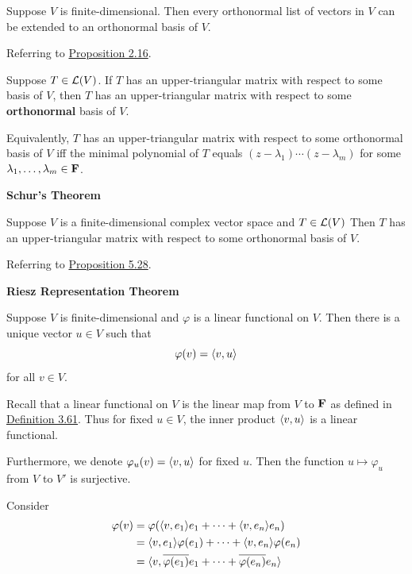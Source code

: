 \documentclass[12pt,a4paper]{article}
\begin{document}
    \begin{prop}\label{6.22}
        Suppose $V$ is finite-dimensional. Then every orthonormal list of vectors in $V$ can be extended to an orthonormal basis of $V$.
    \end{prop}
    \begin{remark}
        Referring to \hyperref[2.16]{Proposition 2.16}.
    \end{remark}
    \hfill

    \begin{prop}\label{6.23}
        Suppose $T\in\mathcal{L}(V)$. If $T$ has an upper-triangular matrix with respect to some basis of $V$, then $T$ has an upper-triangular matrix with respect to some \textbf{orthonormal} basis of $V$.

        Equivalently, $T$ has an upper-triangular matrix with respect to some orthonormal basis of $V$ iff the minimal polynomial of $T$ equals $(z-\lambda_1)\cdots(z-\lambda_m)$ for some $\lambda_1,\dots,\lambda_m\in\mathbf{F}$.
        
    \end{prop}
    \begin{cor}\label{6.24}
        \textbf{Schur’s Theorem}

        Suppose $V$ is a finite-dimensional complex vector space and $T\in\mathcal{L}(V)$ Then $T$ has an upper-triangular matrix with respect to some orthonormal basis of $V$.
    \end{cor}
    \begin{remark}
        Referring to \hyperref[5.28]{Proposition 5.28}.
    \end{remark}
    \hfill

    \begin{thm}\label{6.25}
        \textbf{Riesz Representation Theorem}

        Suppose $V$ is finite-dimensional and $\varphi$ is a linear functional on $V$. Then there is a unique vector $u\in V$ such that 
        $$
        \varphi(v)=\langle v,u\rangle
        $$
        for all $v\in V$.
    \end{thm}
    \begin{remark}
        Recall that a linear functional on $V$ is the linear map from $V$ to $\mathbf{F}$ as defined in \hyperref[3.61]{Definition 3.61}. Thus for fixed $u\in V$, the inner product $\langle v,u\rangle$ is a linear functional.

        Furthermore, we denote $\varphi_{u}(v)=\langle v,u\rangle$ for fixed $u$. Then the function $u\mapsto \varphi_{u}$ from $V$ to $V'$ is surjective.
    \end{remark}   
    \begin{remark}
        Consider
        $$
        \begin{aligned}
            \varphi(v)
            &=\varphi(\langle v,e_1\rangle e_1+\cdots+\langle v,e_n\rangle e_n)\\
            &=\langle v,e_1\rangle\varphi(e_1)+\cdots+\langle v,e_n\rangle\varphi(e_n)\\
            &=\langle v,\overline{\varphi(e_1)}e_1+\cdots+\overline{\varphi(e_n)}e_n\rangle
        \end{aligned}
        $$
    \end{remark}
    \hfill
    
\end{document}

